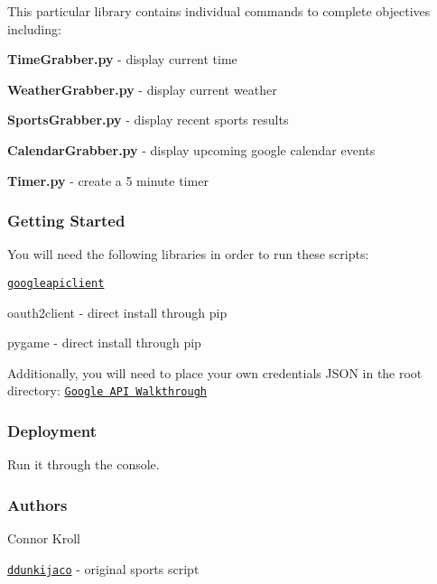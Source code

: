This particular library contains individual commands to complete objectives including\+:
\begin{DoxyItemize}
\item {\bfseries Time\+Grabber.\+py} -\/ display current time
\item {\bfseries Weather\+Grabber.\+py} -\/ display current weather
\item {\bfseries Sports\+Grabber.\+py} -\/ display recent sports results
\item {\bfseries Calendar\+Grabber.\+py} -\/ display upcoming google calendar events
\item {\bfseries Timer.\+py} -\/ create a 5 minute timer
\end{DoxyItemize}

\subsubsection*{Getting Started}

You will need the following libraries in order to run these scripts\+:
\begin{DoxyItemize}
\item \href{https://developers.google.com/api-client-library/python/start/installation}{\tt googleapiclient}
\item oauth2client -\/ direct install through pip
\item pygame -\/ direct install through pip
\end{DoxyItemize}

Additionally, you will need to place your own credentials J\+S\+ON in the root directory\+: \href{https://developers.google.com/calendar/quickstart/python}{\tt Google A\+PI Walkthrough}

\subsubsection*{Deployment}

Run it through the console.

\subsubsection*{Authors}


\begin{DoxyItemize}
\item Connor Kroll
\item \href{https://github.com/ddunkijaco/shellScores}{\tt ddunkijaco} -\/ original sports script 
\end{DoxyItemize}